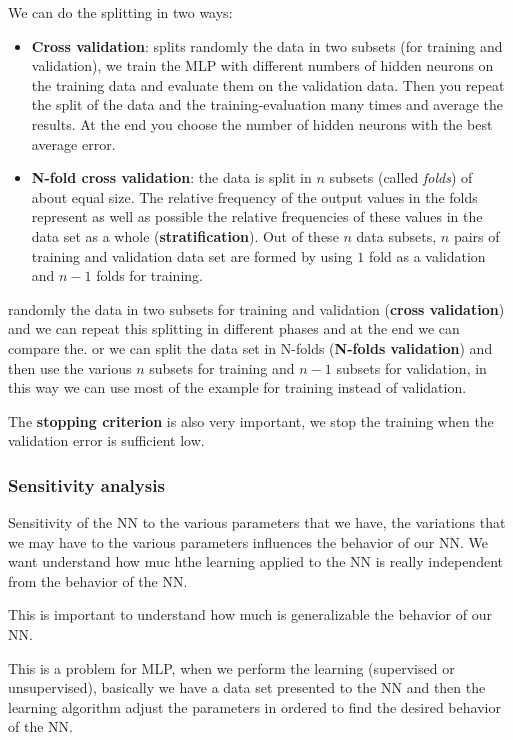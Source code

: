 \documentclass{article}
\begin{document}
We can do the splitting in two ways:
\begin{itemize}
    \item \textbf{Cross validation}: splits randomly the data in two subsets (for training and validation),
          we train the MLP with different numbers of hidden neurons on the training data and evaluate them on the
          validation data. Then you repeat the split of the data and the training-evaluation many times and average the
          results. At the end you choose the number of hidden neurons with the best average error.

    \item \textbf{N-fold cross validation}: the data is split in $n$ subsets (called \textit{folds}) of
          about equal size. The relative frequency of the output values in the folds represent as well as possible the
          relative frequencies of these values in the data set as a whole (\textbf{stratification}). Out of these
          $n$ data subsets, $n$ pairs of training and validation data set are formed by using $1$ fold as a validation
          and $n-1$ folds for training.
\end{itemize}

randomly the data in two subsets for training and validation (\textbf{cross validation}) and we can repeat this splitting in different
phases and at the end we can compare the. or we can split the data set in N-folds (\textbf{N-folds validation})
and then use the various $n$ subsets for training and $n-1$ subsets for validation, in this way we can use
most of the example for training instead of validation.

The \textbf{stopping criterion} is also very important, we stop the training when the validation
error is sufficient low.

\subsubsection{Sensitivity analysis}
Sensitivity of the NN to the various parameters that we have, the variations that we may have to the
various parameters influences the behavior of our NN. We want understand how muc hthe learning applied to the NN
is really independent from the behavior of the NN.

This is important to understand how much is generalizable the behavior of our NN.

This is a problem for MLP, when we perform the learning (supervised or unsupervised), basically we have a
data set presented to the NN and then the learning algorithm adjust the parameters in ordered to find the
desired behavior of the NN.
\end{document}
